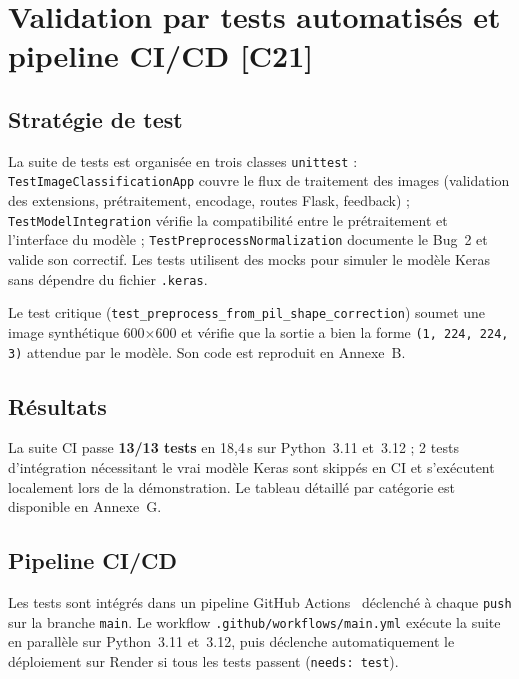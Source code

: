 \documentclass[french, a4paper, 12pt]{article}
\begin{document}
\section{Validation par tests automatisés et pipeline CI/CD \textnormal{\small\textcolor{RNCPred}{[C21]}}}

\subsection{Stratégie de test}

La suite de tests est organisée en trois classes \texttt{unittest} :
\texttt{TestImageClassificationApp} couvre le flux de traitement des images
(validation des extensions, prétraitement, encodage, routes Flask, feedback) ;
\texttt{TestModelIntegration} vérifie la compatibilité entre le prétraitement
et l'interface du modèle ; \texttt{TestPreprocessNormalization} documente le
Bug~2 et valide son correctif. Les tests utilisent des \gls{mock}s pour simuler le
modèle Keras sans dépendre du fichier \texttt{.keras}.

Le test critique (\texttt{test\_preprocess\_from\_pil\_shape\_correction})
soumet une image synthétique 600$\times$600 et vérifie que la sortie a bien
la forme \texttt{(1, 224, 224, 3)} attendue par le modèle. Son code est
reproduit en Annexe~B.

\subsection{Résultats}

La suite CI passe \textbf{13/13 tests} en 18,4\,s sur Python~3.11 et~3.12 ;
2 tests d'intégration nécessitant le vrai modèle Keras sont skippés en CI
et s'exécutent localement lors de la démonstration. Le tableau détaillé par
catégorie est disponible en Annexe~G.

\subsection{Pipeline CI/CD}

Les tests sont intégrés dans un pipeline GitHub Actions~\cite{GitHubActions}
déclenché à chaque \texttt{push} sur la branche \texttt{main}. Le workflow
\texttt{.github/workflows/main.yml} exécute la suite en parallèle sur
Python~3.11 et~3.12, puis déclenche automatiquement le déploiement sur Render
si tous les tests passent (\texttt{needs: test}).
\end{document}
